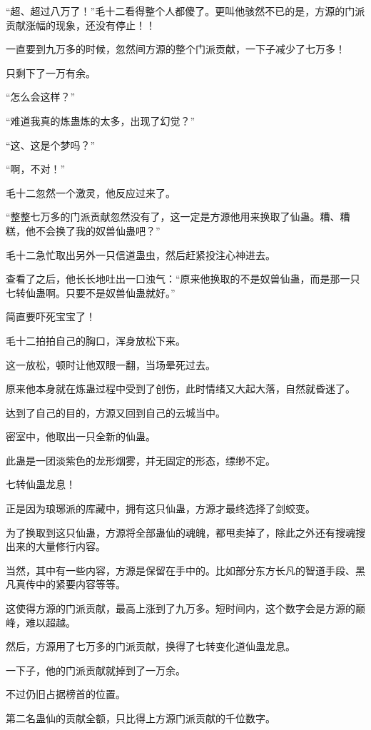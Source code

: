 \begin{this_body}
“超、超过八万了！”毛十二看得整个人都傻了。更叫他骇然不已的是，方源的门派贡献涨幅的现象，还没有停止！！

一直要到九万多的时候，忽然间方源的整个门派贡献，一下子减少了七万多！

只剩下了一万有余。

“怎么会这样？”

“难道我真的炼蛊炼的太多，出现了幻觉？”

“这、这是个梦吗？”

“啊，不对！”

毛十二忽然一个激灵，他反应过来了。

“整整七万多的门派贡献忽然没有了，这一定是方源他用来换取了仙蛊。糟、糟糕，他不会换了我的奴兽仙蛊吧？”

毛十二急忙取出另外一只信道蛊虫，然后赶紧投注心神进去。

查看了之后，他长长地吐出一口浊气：“原来他换取的不是奴兽仙蛊，而是那一只七转仙蛊啊。只要不是奴兽仙蛊就好。”

简直要吓死宝宝了！

毛十二拍拍自己的胸口，浑身放松下来。

这一放松，顿时让他双眼一翻，当场晕死过去。

原来他本身就在炼蛊过程中受到了创伤，此时情绪又大起大落，自然就昏迷了。

达到了自己的目的，方源又回到自己的云城当中。

密室中，他取出一只全新的仙蛊。

此蛊是一团淡紫色的龙形烟雾，并无固定的形态，缥缈不定。

七转仙蛊龙息！

正是因为琅琊派的库藏中，拥有这只仙蛊，方源才最终选择了剑蛟变。

为了换取到这只仙蛊，方源将全部蛊仙的魂魄，都甩卖掉了，除此之外还有搜魂搜出来的大量修行内容。

当然，其中有一些内容，方源是保留在手中的。比如部分东方长凡的智道手段、黑凡真传中的紧要内容等等。

这使得方源的门派贡献，最高上涨到了九万多。短时间内，这个数字会是方源的巅峰，难以超越。

然后，方源用了七万多的门派贡献，换得了七转变化道仙蛊龙息。

一下子，他的门派贡献就掉到了一万余。

不过仍旧占据榜首的位置。

第二名蛊仙的贡献全额，只比得上方源门派贡献的千位数字。


\end{this_body}
